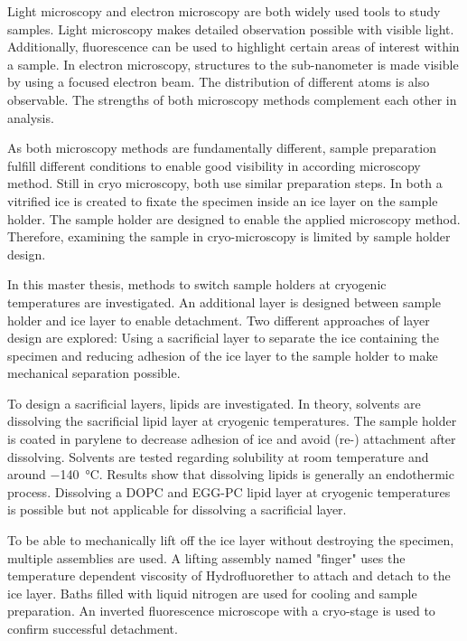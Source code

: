 Light microscopy and electron microscopy are both widely used tools to study samples. Light microscopy makes detailed observation possible with visible light. Additionally, fluorescence can be used to highlight certain areas of interest within a sample. In electron microscopy, structures to the sub-nanometer is made visible by using a focused electron beam. The distribution of different atoms is also observable. The strengths of both microscopy methods complement each other in analysis. 

As both microscopy methods are fundamentally different, sample preparation fulfill different conditions to enable good visibility in according microscopy method. Still in cryo microscopy, both use similar preparation steps. In both a vitrified ice is created to fixate the specimen inside an ice layer on the sample holder. The sample holder are designed to enable the applied microscopy method. Therefore, examining the sample in cryo-microscopy is limited by sample holder design.

In this master thesis, methods to switch sample holders at cryogenic temperatures are investigated. An additional layer is designed between sample holder and ice layer to enable detachment. Two different approaches of layer design are explored: Using a sacrificial layer to separate the ice containing the specimen and reducing adhesion of the ice layer to the sample holder to make mechanical separation possible.

To design a sacrificial layers, lipids are investigated. In theory, solvents are dissolving the sacrificial lipid layer at cryogenic temperatures. The sample holder is coated in parylene to decrease adhesion of ice and avoid (re-) attachment after dissolving. Solvents are tested regarding solubility at room temperature and around \SI{-140}{\degreeCelsius}. Results show that dissolving lipids is generally an endothermic process. Dissolving a DOPC and EGG-PC lipid layer at cryogenic temperatures is possible but not applicable for dissolving a sacrificial layer. 

To be able to mechanically lift off the ice layer without destroying the specimen, multiple assemblies are used. A lifting assembly named "finger" uses the temperature dependent viscosity of Hydrofluorether to attach and detach to the ice layer. Baths filled with liquid nitrogen are used for cooling and sample preparation. An inverted fluorescence microscope with a cryo-stage is used to confirm successful detachment.

